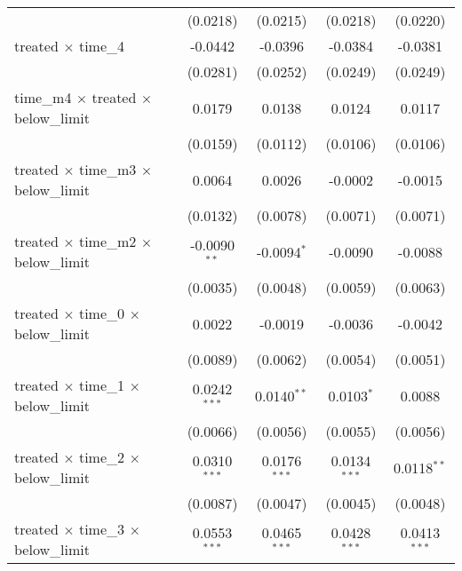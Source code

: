 \begin{tabular}{lcccc}
                                                       & (0.0218)        & (0.0215)        & (0.0218)        & (0.0220)\\   
   treated $\times$ time\_4                            & -0.0442         & -0.0396         & -0.0384         & -0.0381\\   
                                                       & (0.0281)        & (0.0252)        & (0.0249)        & (0.0249)\\   
   time\_m4 $\times$ treated $\times$ below\_limit     & 0.0179          & 0.0138          & 0.0124          & 0.0117\\   
                                                       & (0.0159)        & (0.0112)        & (0.0106)        & (0.0106)\\   
   treated $\times$ time\_m3 $\times$ below\_limit     & 0.0064          & 0.0026          & -0.0002         & -0.0015\\   
                                                       & (0.0132)        & (0.0078)        & (0.0071)        & (0.0071)\\   
   treated $\times$ time\_m2 $\times$ below\_limit     & -0.0090$^{**}$  & -0.0094$^{*}$   & -0.0090         & -0.0088\\   
                                                       & (0.0035)        & (0.0048)        & (0.0059)        & (0.0063)\\   
   treated $\times$ time\_0 $\times$ below\_limit      & 0.0022          & -0.0019         & -0.0036         & -0.0042\\   
                                                       & (0.0089)        & (0.0062)        & (0.0054)        & (0.0051)\\   
   treated $\times$ time\_1 $\times$ below\_limit      & 0.0242$^{***}$  & 0.0140$^{**}$   & 0.0103$^{*}$    & 0.0088\\   
                                                       & (0.0066)        & (0.0056)        & (0.0055)        & (0.0056)\\   
   treated $\times$ time\_2 $\times$ below\_limit      & 0.0310$^{***}$  & 0.0176$^{***}$  & 0.0134$^{***}$  & 0.0118$^{**}$\\   
                                                       & (0.0087)        & (0.0047)        & (0.0045)        & (0.0048)\\   
   treated $\times$ time\_3 $\times$ below\_limit      & 0.0553$^{***}$  & 0.0465$^{***}$  & 0.0428$^{***}$  & 0.0413$^{***}$\\   

\end{tabular}
